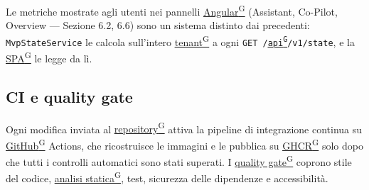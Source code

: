 \documentclass[a4paper,12pt]{article}
\providecommand{\glslink}[2]{\href{https://alittlebyte-19.github.io/Documentazione/glossario.html\#gls-#1}{\underline{#2}\textsuperscript{\scriptsize G}}}
\begin{document}
Le metriche mostrate agli utenti nei pannelli \glslink{angular}{Angular} (Assistant, Co-Pilot, Overview — Sezione 6.2, 6.6) sono un sistema distinto dai precedenti: \texttt{MvpStateService} le calcola sull'intero \glslink{tenant}{tenant} a ogni \texttt{GET /\glslink{api-application-programming-interface}{api}/v1/state}, e la \glslink{spa-single-page-application}{SPA} le legge da lì.

\subsection{CI e quality gate}

Ogni modifica inviata al \glslink{repository}{repository} attiva la pipeline di integrazione continua su \glslink{github}{GitHub} Actions, che ricostruisce le immagini e le pubblica su \glslink{ghcr-github-container-registry}{GHCR} solo dopo che tutti i controlli automatici sono stati superati. I \glslink{quality-gate}{quality gate} coprono stile del codice, \glslink{analisi-statica}{analisi statica}, test, sicurezza delle dipendenze e accessibilità.
\end{document}
